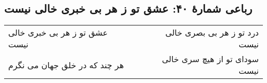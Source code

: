 \begin{center}
\section*{رباعی شمارهٔ ۴۰: عشق تو ز هر بی خبری خالی نیست}
\label{sec:040}
\begin{longtable}{l p{0.5cm} r}
عشق تو ز هر بی خبری خالی نیست
&&
درد تو ز هر بی بصری خالی نیست
\\
هر چند که در خلق جهان می نگرم
&&
سودای تو از هیچ سری خالی نیست
\\
\end{longtable}
\end{center}
